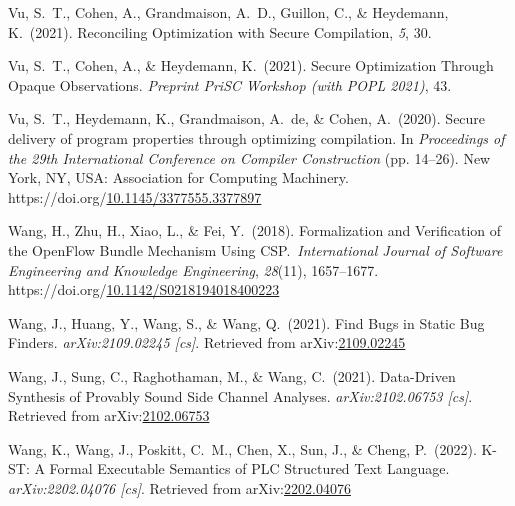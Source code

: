\documentclass[12pt,twoside]{article}
\begin{document}
{\begin{thebibliography}{1079}
\mdbibitemlabel{}Vu, S.~T., Cohen, A., Grandmaison, A.~D., Guillon, C., \& Heydemann, K.~(2021). Reconciling Optimization with Secure Compilation, \emph{5}, 30.%

\mdbibitemlabel{}Vu, S.~T., Cohen, A., \& Heydemann, K.~(2021). Secure Optimization Through Opaque Observations. \emph{Preprint PriSC Workshop (with POPL 2021)}, 43.%

\mdbibitemlabel{}Vu, S.~T., Heydemann, K., Grandmaison, A.~de, \& Cohen, A.~(2020). Secure delivery of program properties through optimizing compilation. In \emph{Proceedings of the 29th International Conference on Compiler Construction} (pp. 14–26). New York, NY, USA: Association for Computing Machinery. https://doi.org/\href{https://dx.doi.org/10.1145/3377555.3377897}{10.1145/3377555.3377897}%

\mdbibitemlabel{}Wang, H., Zhu, H., Xiao, L., \& Fei, Y.~(2018). Formalization and Verification of the OpenFlow Bundle Mechanism Using CSP.~\emph{International Journal of Software Engineering and Knowledge Engineering}, \emph{28}(11), 1657–1677. https://doi.org/\href{https://dx.doi.org/10.1142/S0218194018400223}{10.1142/S0218194018400223}%

\mdbibitemlabel{}Wang, J., Huang, Y., Wang, S., \& Wang, Q.~(2021). Find Bugs in Static Bug Finders. \emph{arXiv:2109.02245 {}[cs]}. Retrieved from arXiv:\href{http://arxiv.org/abs/2109.02245}{2109.02245}%

\mdbibitemlabel{}Wang, J., Sung, C., Raghothaman, M., \& Wang, C.~(2021). Data-Driven Synthesis of Provably Sound Side Channel Analyses. \emph{arXiv:2102.06753 {}[cs]}. Retrieved from arXiv:\href{http://arxiv.org/abs/2102.06753}{2102.06753}%

\mdbibitemlabel{}Wang, K., Wang, J., Poskitt, C.~M., Chen, X., Sun, J., \& Cheng, P.~(2022). K-ST: A Formal Executable Semantics of PLC Structured Text Language. \emph{arXiv:2202.04076 {}[cs]}. Retrieved from arXiv:\href{http://arxiv.org/abs/2202.04076}{2202.04076}%


\end{thebibliography}}
\end{document}
